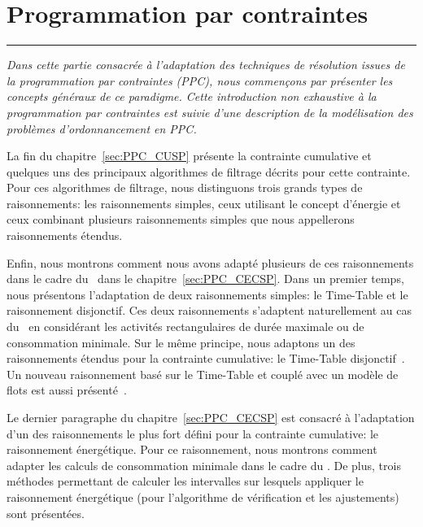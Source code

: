 

\cleardoublepage
\begin{minipage}{0.95\linewidth}
\part{Programmation par contraintes}
\label{part:PPC}
\vspace{15mm} %
\parttoc 
\end{minipage}

\newpage
\thispagestyle{empty}
\begin{center}
  \begin{minipage}{\textwidth}
    \hrule
    \vspace{0.5cm}
    {\it Dans cette partie consacrée à l'adaptation des techniques de
      résolution issues de la programmation par contraintes (PPC), nous
      commençons par présenter les concepts généraux de ce
      paradigme. Cette introduction non exhaustive à la programmation
      par contraintes est suivie d'une description de la modélisation
      des problèmes d'ordonnancement en PPC. 

      La fin du chapitre~\ref{sec:PPC_CUSP} présente la contrainte
      cumulative et quelques uns des principaux algorithmes de filtrage décrits
      pour cette contrainte. Pour ces algorithmes de filtrage, nous
      distinguons trois grands types de raisonnements: les
      raisonnements simples, ceux utilisant le concept d'énergie et
      ceux combinant plusieurs raisonnements simples que nous
      appellerons raisonnements étendus. 
    
      Enfin, nous montrons comment nous avons adapté plusieurs de ces
      raisonnements dans le cadre du \CECSP~dans le
      chapitre~\ref{sec:PPC_CECSP}. Dans un premier temps, nous présentons
      l'adaptation de deux raisonnements simples: le Time-Table et le
      raisonnement disjonctif. Ces deux raisonnements s'adaptent 
      naturellement au cas du \CECSP~en considérant les activités
      rectangulaires de durée maximale ou de consommation
      minimale. Sur le même principe, nous adaptons un des
      raisonnements étendus pour la contrainte cumulative: le 
      Time-Table disjonctif~\cite{Gay2015}. Un nouveau raisonnement
      basé sur le Time-Table et couplé avec un modèle de flots est
      aussi présenté~\cite{Nattaf_CPDP}.

      Le dernier paragraphe du chapitre~\ref{sec:PPC_CECSP} est
      consacré à l'adaptation d'un des raisonnements  le plus fort défini pour la
      contrainte cumulative: le raisonnement énergétique. Pour ce
      raisonnement, nous montrons comment adapter les calculs de
      consommation minimale dans le cadre du \CECSP. De plus, trois
      méthodes permettant de calculer les intervalles sur lesquels
      appliquer le raisonnement énergétique (pour l'algorithme de
      vérification et les ajustements) sont présentées. 

}
\end{minipage}
\end{center}
